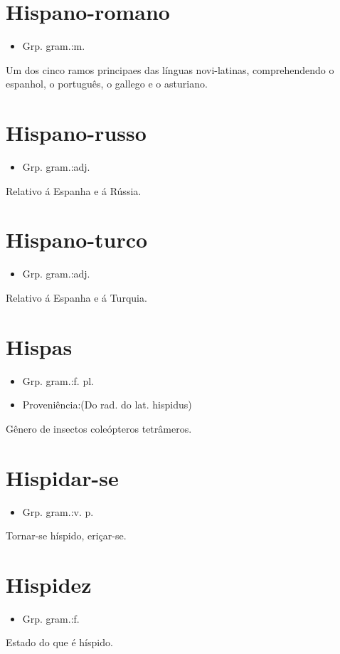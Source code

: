 \documentclass{article}
\begin{document}
\section{Hispano-romano}
\begin{itemize}
\item {Grp. gram.:m.}
\end{itemize}
Um dos cinco ramos principaes das línguas novi-latinas, comprehendendo o espanhol, o português, o gallego e o asturiano.
\section{Hispano-russo}
\begin{itemize}
\item {Grp. gram.:adj.}
\end{itemize}
Relativo á Espanha e á Rússia.
\section{Hispano-turco}
\begin{itemize}
\item {Grp. gram.:adj.}
\end{itemize}
Relativo á Espanha e á Turquia.
\section{Hispas}
\begin{itemize}
\item {Grp. gram.:f. pl.}
\end{itemize}
\begin{itemize}
\item {Proveniência:(Do rad. do lat. \textunderscore hispidus\textunderscore )}
\end{itemize}
Gênero de insectos coleópteros tetrâmeros.
\section{Hispidar-se}
\begin{itemize}
\item {Grp. gram.:v. p.}
\end{itemize}
Tornar-se híspido, eriçar-se.
\section{Hispidez}
\begin{itemize}
\item {Grp. gram.:f.}
\end{itemize}
Estado do que é híspido.
\end{document}
